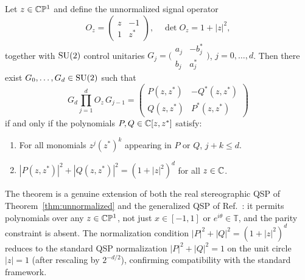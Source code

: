 \begin{theorem}
	\label{thm:gqsp-stereo}
	Let $z \in \mathbb{C}\mathbb{P}^1$ and define the unnormalized signal
	operator
	\begin{equation}
		O_z = \begin{pmatrix} z & -1 \\ 1 & z^* \end{pmatrix},
		\quad \det O_z = 1 + |z|^2,
		\label{eq:gqsp-signal}
	\end{equation}
	together with $\mathrm{SU}(2)$ control unitaries
	$G_j = \bigl(\begin{smallmatrix}
	a_j & -b_j^* \\ b_j & a_j^* \end{smallmatrix}\bigr)$,
	$j = 0, \ldots, d$.  Then there exist
	$G_0, \ldots, G_d \in \mathrm{SU}(2)$ such that
	\begin{equation}
		G_d \prod_{j=1}^{d} O_z\, G_{j-1}
		= \begin{pmatrix} P(z,z^*) & -Q^*(z,z^*) \\
		Q(z,z^*) & P^*(z,z^*) \end{pmatrix}
		\label{eq:gqsp-product}
	\end{equation}
	if and only if the polynomials $P, Q \in \mathbb{C}[z,z^*]$ satisfy:
	\begin{enumerate}
		\item For all monomials $z^j(z^*)^k$ appearing in $P$ or
		      $Q$, $j + k \leq d$.
		\item $|P(z,z^*)|^2 + |Q(z,z^*)|^2 = (1+|z|^2)^d$ for
		      all $z \in \mathbb{C}$.
	\end{enumerate}
\end{theorem}

The theorem is a genuine extension of both the real
stereographic QSP of Theorem~\ref{thm:unnormalized} and the
generalized QSP of Ref.~\cite{MotlaghWiebe2023}: it permits
polynomials over any $z \in \mathbb{C}\mathbb{P}^1$, not just
$x \in [-1,1]$ or $e^{i\theta} \in \mathbb{T}$, and the
parity constraint is absent.  The normalization condition
$|P|^2 + |Q|^2 = (1+|z|^2)^d$ reduces to the standard QSP
normalization $|P|^2 + |Q|^2 = 1$ on the unit circle
$|z| = 1$ (after rescaling by $2^{-d/2}$), confirming
compatibility with the standard framework.

